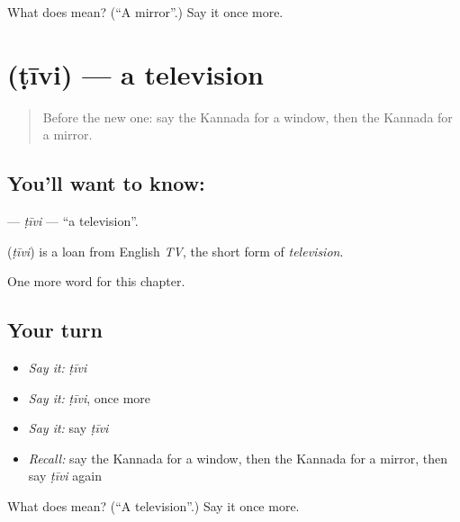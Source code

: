 \begin{tcolorbox}[breakable,colback=teal!4,colframe=teal!35!black,title={Before you move on}]
What does  mean? (\textquotedblleft{}A mirror\textquotedblright{}.) Say it once more.
\end{tcolorbox}
\section[\texorpdfstring{\kn{ಟೀವಿ} (ṭīvi)}{ಟೀವಿ (ṭīvi)}]{ (ṭīvi) — a television}

\label{lesson:KA-C137-tivi}



\begin{quote}
Before the new one: say the Kannada for a window, then the Kannada for a mirror.
\end{quote}

\subsection*{You'll want to know: }
\textbf{} — \emph{ṭīvi} — \textquotedblleft{}a television\textquotedblright{}.

\begin{cousinweb}
\textbf{} (\emph{ṭīvi}) is a loan from English \emph{TV}, the short form of \emph{television}.
\end{cousinweb}

\begin{grammarlens}[title={What you've built}]
One more word for this chapter.
\end{grammarlens}

\subsection*{Your turn}
\begin{itemize}
\raggedright
  \item \emph{Say it:} \emph{ṭīvi}
  \item \emph{Say it:} \emph{ṭīvi}, once more
  \item \emph{Say it:} say \emph{ṭīvi}
  \item \emph{Recall:} say the Kannada for a window, then the Kannada for a mirror, then say \emph{ṭīvi} again
\end{itemize}

\begin{tcolorbox}[breakable,colback=teal!4,colframe=teal!35!black,title={Before you move on}]
What does  mean? (\textquotedblleft{}A television\textquotedblright{}.) Say it once more.
\end{tcolorbox}
